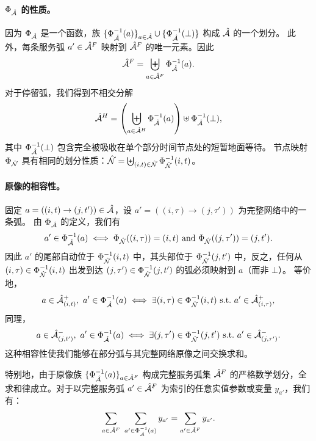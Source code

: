 \paragraph*{$\Phi_{\hat{\mathcal{A}}}$ 的性质。}
因为 $\Phi_{\hat{\mathcal{A}}}$ 是一个函数，族 $\{\Phi_{\hat{\mathcal{A}}}^{-1}(a)\}_{a\in\hat{\mathcal{A}}}\cup\{\Phi_{\hat{\mathcal{A}}}^{-1}(\bot)\}$ 构成 $\full{\arcSet}$ 的一个划分。
此外，每条服务弧 $a'\in\full{\flightArc}$ 映射到 ${\hat{\mathcal{A}}^F_{{}}}$ 的唯一元素。因此
\[
    \full{\flightArc} = \biguplus_{a\in\flightArc}\Phi_{\arcSet}^{-1}(a).
\]
对于停留弧，我们得到不相交分解
\[
    \full{\holdingArc} = \left(\biguplus_{a\in\holdingArc}\Phi_{\arcSet}^{-1}(a)\right) \uplus \Phi_{\arcSet}^{-1}(\bot),
\]
其中 $\Phi_{\hat{\mathcal{A}}}^{-1}(\bot)$ 包含完全被吸收在单个部分时间节点处的短暂地面等待。
节点映射 $\Phi_{\hat{\mathcal{N}}}$ 具有相同的划分性质：$\full{\nodeSet} = \biguplus_{(i,t)\in\nodeSet} \Phi_{\nodeSet}^{-1}(i,t)$。

\paragraph*{原像的相容性。}
固定 $a=((i,t)\rightarrow(j,t'))\in\hat{\mathcal{A}}$，设 $a'=((i,\tau)\rightarrow(j,\tau'))$ 为完整网络中的一条弧。
由 $\Phi_{\hat{\mathcal{A}}}$ 的定义，我们有
\[
    a'\in\Phi_{\arcSet}^{-1}(a)
    \iff 
    \Phi_{\nodeSet}((i,\tau))=(i,t)\ \text{and}\ \Phi_{\nodeSet}((j,\tau'))=(j,t').
\]
因此 $a'$ 的尾部自动位于 $\Phi_{\hat{\mathcal{N}}}^{-1}(i,t)$ 中，其头部位于 $\Phi_{\hat{\mathcal{N}}}^{-1}(j,t')$ 中，反之，任何从 $(i,\tau)\in\Phi_{\hat{\mathcal{N}}}^{-1}(i,t)$ 出发到达 $(j,\tau')\in\Phi_{\hat{\mathcal{N}}}^{-1}(j,t')$ 的弧必须映射到 $a$（而非 $\bot$）。
等价地，
\[
    a\in\outArcSet{(i,t)},\ a'\in\Phi_{\arcSet}^{-1}(a)
    \iff \exists (i,\tau)\in\Phi_{\nodeSet}^{-1}(i,t)\ \text{s.t.}\ a'\in\outArcSet{(i,\tau)},
\]
同理，
\[
    a\in\inArcSet{(j,t')},\ a'\in\Phi_{\arcSet}^{-1}(a)
    \iff \exists (j,\tau')\in\Phi_{\nodeSet}^{-1}(j,t')\ \text{s.t.}\ a'\in\inArcSet{(j,\tau')}.
\]
这种相容性使我们能够在部分弧与其完整网络原像之间交换求和。

特别地，由于原像族 $\{\Phi_{\hat{\mathcal{A}}}^{-1}(a)\}_{a\in{\hat{\mathcal{A}}^F_{{}}}}$ 构成完整服务弧集 $\full{\flightArc}$ 的严格数学划分，全求和律成立。对于以完整服务弧 $a'\in\full{\flightArc}$ 为索引的任意实值参数或变量 $y_{a'}$，我们有：
\[
    \sum_{a\in\flightArc}\ \sum_{a'\in\Phi_{\arcSet}^{-1}(a)} y_{a'} 
    = \sum_{a'\in\full{\flightArc}} y_{a'}.
\]